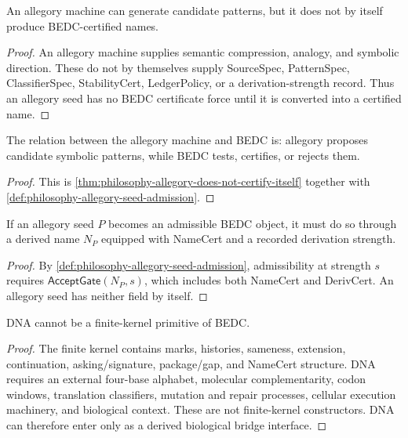 \begin{theorem}
\label{thm:philosophy-allegory-does-not-certify-itself}
An allegory machine can generate candidate patterns, but it does not by
itself produce BEDC-certified names.
\end{theorem}
\begin{proof}
An allegory machine supplies semantic compression, analogy, and symbolic
direction. These do not by themselves supply SourceSpec, PatternSpec,
ClassifierSpec, StabilityCert, LedgerPolicy, or a derivation-strength
record. Thus an allegory seed has no BEDC certificate force until it is
converted into a certified name.
\end{proof}

\begin{corollary}
\label{cor:philosophy-allegory-proposes-bedc-certifies}
The relation between the allegory machine and BEDC is: allegory proposes
candidate symbolic patterns, while BEDC tests, certifies, or rejects
them.
\end{corollary}
\begin{proof}
This is \autoref{thm:philosophy-allegory-does-not-certify-itself}
together with \autoref{def:philosophy-allegory-seed-admission}.
\end{proof}

\begin{theorem}
\label{thm:philosophy-allegory-seeds-enter-through-namecert}
If an allegory seed $P$ becomes an admissible BEDC object, it must do so
through a derived name $N_{P}$ equipped with NameCert and a recorded
derivation strength.
\end{theorem}
\begin{proof}
By \autoref{def:philosophy-allegory-seed-admission}, admissibility at
strength $s$ requires $\mathsf{AcceptGate}(N_{P},s)$, which includes both
NameCert and DerivCert. An allegory seed has neither field by itself.
\end{proof}

\begin{theorem}
\label{thm:philosophy-dna-not-kernel-primitive}
DNA cannot be a finite-kernel primitive of BEDC.
\end{theorem}
\begin{proof}
The finite kernel contains marks, histories, sameness, extension,
continuation, asking/signature, package/gap, and NameCert structure.
DNA requires an external four-base alphabet, molecular complementarity,
codon windows, translation classifiers, mutation and repair processes,
cellular execution machinery, and biological context. These are not
finite-kernel constructors. DNA can therefore enter only as a derived
biological bridge interface.
\end{proof}

